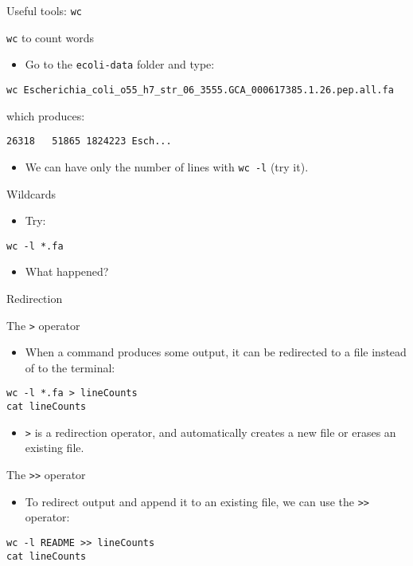 \documentclass[big]{beamer}
\begin{document}
\begin{frame}[fragile,label=sec-3-1]{Useful tools: \texttt{wc}}
 \begin{block}{\texttt{wc} to count words}
\begin{itemize}
\item Go to the \texttt{ecoli-data} folder and type:
\end{itemize}
\begin{verbatim}
wc Escherichia_coli_o55_h7_str_06_3555.GCA_000617385.1.26.pep.all.fa
\end{verbatim}
which produces:
\begin{verbatim}
26318   51865 1824223 Esch...
\end{verbatim}
\begin{itemize}
\item We can have only the number of lines with \texttt{wc -l} (try it).
\end{itemize}
\end{block}
\begin{block}{Wildcards}
\begin{itemize}
\item Try:
\end{itemize}
\begin{verbatim}
wc -l *.fa
\end{verbatim}
\begin{itemize}
\item What happened?
\end{itemize}
\end{block}
\end{frame}
\begin{frame}[fragile,label=sec-3-2]{Redirection}
 \begin{block}{The \texttt{>} operator}
\begin{itemize}
\item When a command produces some output, it can be redirected to a file instead
of to the terminal:
\end{itemize}
\begin{verbatim}
wc -l *.fa > lineCounts
cat lineCounts
\end{verbatim}
\begin{itemize}
\item \texttt{>} is a \alert{redirection} operator, and automatically creates a new file or
erases an existing file.
\end{itemize}
\end{block}
\begin{block}{The \texttt{>>} operator}
\begin{itemize}
\item To redirect output and append it to an existing file, we can use the \texttt{>>}
operator:
\end{itemize}
\begin{verbatim}
wc -l README >> lineCounts
cat lineCounts
\end{verbatim}
\end{block}
\end{frame}
\end{document}
